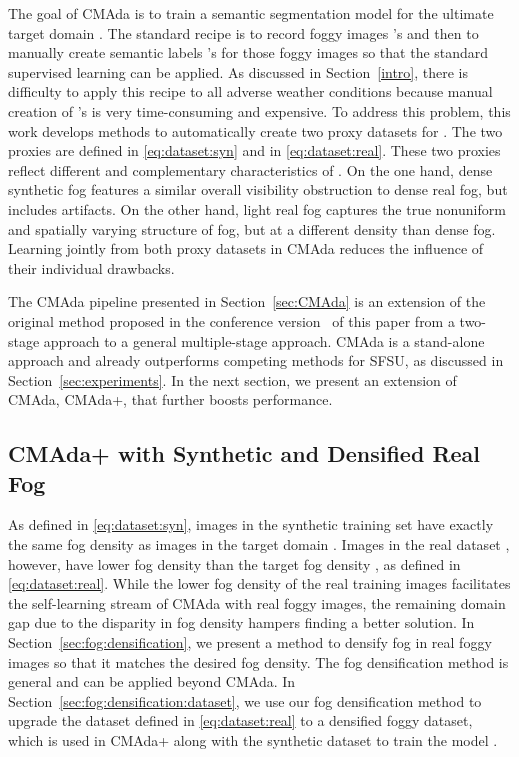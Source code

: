 \documentclass[twocolumn]{svjour3}          \smartqed  \usepackage{graphicx}
\begin{document}
The goal of CMAda is to train a semantic segmentation model for the ultimate target domain . The standard recipe is to record foggy images 's and then to manually create semantic labels 's for those foggy images so that the standard supervised learning can be applied. As discussed in Section~\ref{intro}, there is difficulty to apply this recipe to all adverse weather conditions because manual creation of 's is very time-consuming and expensive. To address this problem, this work develops methods to automatically create two proxy datasets for . The two proxies are defined in \eqref{eq:dataset:syn} and in \eqref{eq:dataset:real}. These two proxies reflect different and complementary characteristics of .  On the one hand, dense synthetic fog features a similar overall visibility obstruction to dense real fog, but includes artifacts. On the other hand, light real fog captures the true nonuniform and spatially varying structure of fog, but at a different density than dense fog. Learning jointly from both proxy datasets in CMAda reduces the influence of their individual drawbacks.

The CMAda pipeline presented in Section~\ref{sec:CMAda} is an extension of the original method proposed in the conference version~\cite{dense:SFSU:eccv18} of this paper from a two-stage approach to a general multiple-stage approach. CMAda is a stand-alone approach and already outperforms competing methods for SFSU, as discussed in Section~\ref{sec:experiments}. In the next section, we present an extension of CMAda, CMAda+, that further boosts performance.
       
\subsection{CMAda+ with Synthetic and Densified Real Fog}
\label{sec:CMAda+}

As defined in \eqref{eq:dataset:syn}, images in the synthetic training set  have exactly the same fog density  as images in the target domain . Images in the real dataset , however, have lower fog density than the target fog density , as defined in \eqref{eq:dataset:real}. While the lower fog density of the real training images facilitates the self-learning stream of CMAda with real foggy images, the remaining domain gap due to the disparity in fog density hampers finding a better solution. In Section~\ref{sec:fog:densification}, we present a method to densify fog in real foggy images so that it matches the desired fog density. The fog densification method is general and can be applied beyond CMAda. In Section~\ref{sec:fog:densification:dataset}, we use our fog densification method to upgrade the dataset defined in \eqref{eq:dataset:real} to a densified foggy dataset, which is used in CMAda+ along with the synthetic dataset to train the model . 
\end{document}
